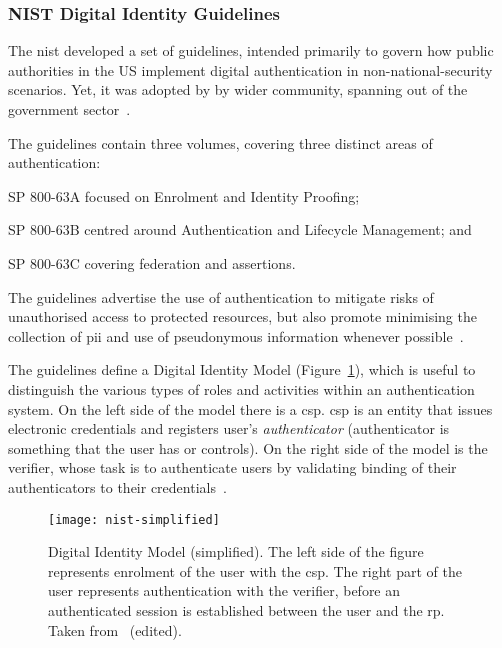 \subsubsection{NIST Digital Identity Guidelines}

The \acrfull{nist} developed a set of guidelines, intended primarily to govern how public authorities in the US implement digital authentication in non-national-security scenarios. Yet, it was adopted by by wider community, spanning out of the government sector~\cite{Grassi2017GovernmentCollaboration}.

The guidelines contain three volumes, covering three distinct areas of authentication:
\begin{enumerate*}[label=(\roman*)]
    \item SP 800-63A focused on Enrolment and Identity Proofing;
    \item SP 800-63B centred around Authentication and Lifecycle Management; and
    \item SP 800-63C covering federation and assertions.
\end{enumerate*}
The guidelines advertise the use of authentication to mitigate risks of unauthorised access to protected resources, but also promote minimising the collection of \acrfull{pii} and use of pseudonymous information whenever possible~\cite{Grassi2017Digital3}.

The guidelines define a Digital Identity Model (Figure~\ref{fig:nist-model}), which is useful to distinguish the various types of roles and activities within an authentication system. On the left side of the model there is a \acrfull{csp}. \acrshort{csp} is an entity that issues electronic credentials and registers user's \textit{authenticator} (authenticator is something that the user has or controls). On the right side of the model is the verifier, whose task is to authenticate users by validating binding of their authenticators to their credentials~\cite{Grassi2017Digital3}.

 \begin{figure}[ht]
    \centering
    \texttt{[image: nist-simplified]}
    \caption{Digital Identity Model (simplified). The left side of the figure represents enrolment of the user with the \acrshort{csp}. The right part of the user represents authentication with the verifier, before an authenticated session is established between the user and the \acrshort{rp}. Taken from~\cite{Grassi2017Digital3} (edited).}
    \label{fig:nist-model}
\end{figure}

